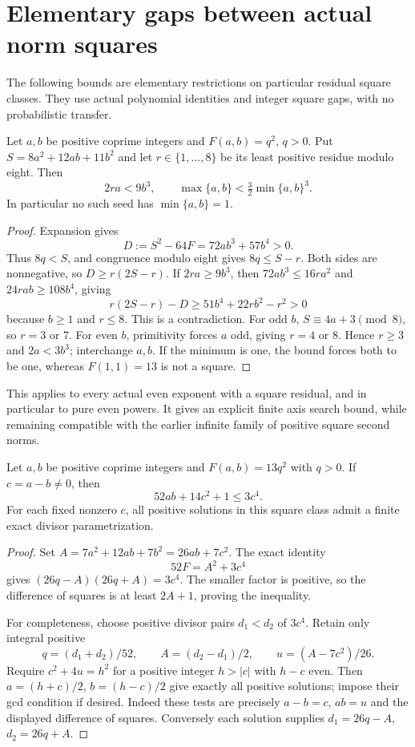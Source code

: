 \section{Elementary gaps between actual norm squares}
\label{sgap-section}

The following bounds are elementary restrictions on particular residual
square classes. They use actual polynomial identities and integer
square gaps, with no probabilistic transfer.

\begin{theorem}\label{sgap-axis}
Let $a,b$ be positive coprime integers and $F(a,b)=q^2$, $q>0$.
Put $S=8a^2+12ab+11b^2$ and let $r\in\{1,\ldots,8\}$ be its
least positive residue modulo eight. Then
\[
 2ra<9b^3,\qquad
 \max\{a,b\}<\tfrac32\min\{a,b\}^3.
\]
In particular no such seed has $\min\{a,b\}=1$.
\end{theorem}
\begin{proof}
Expansion gives
\[
 D:=S^2-64F=72ab^3+57b^4>0.
\]
Thus $8q<S$, and congruence modulo eight gives $8q\le S-r$.
Both sides are nonnegative, so $D\ge r(2S-r)$. If $2ra\ge9b^3$,
then $72ab^3\le16ra^2$ and $24rab\ge108b^4$, giving
\[
 r(2S-r)-D\ge51b^4+22rb^2-r^2>0
\]
because $b\ge1$ and $r\le8$. This is a contradiction. For odd $b$,
$S\equiv4a+3\pmod8$, so $r=3$ or $7$. For even $b$, primitivity
forces $a$ odd, giving $r=4$ or $8$. Hence $r\ge3$ and $2a<3b^3$;
interchange $a,b$. If the minimum is one, the bound forces both to
be one, whereas $F(1,1)=13$ is not a square.
\end{proof}

This applies to every actual even exponent with a square residual,
and in particular to pure even powers. It gives an explicit finite
axis search bound, while remaining compatible with the earlier
infinite family of positive square second norms.

\begin{proposition}\label{sgap-diagonal}
Let $a,b$ be positive coprime integers and $F(a,b)=13q^2$ with $q>0$.
If $c=a-b\ne0$, then
\[
 52ab+14c^2+1\le3c^4.
\]
For each fixed nonzero $c$, all positive solutions in this square
class admit a finite exact divisor parametrization.
\end{proposition}
\begin{proof}
Set $A=7a^2+12ab+7b^2=26ab+7c^2$. The exact identity
\[
 52F=A^2+3c^4
\]
gives $(26q-A)(26q+A)=3c^4$. The smaller factor is positive, so
the difference of squares is at least $2A+1$, proving the inequality.

For completeness, choose positive divisor pairs $d_1<d_2$ of $3c^4$.
Retain only integral positive
\[
 q=(d_1+d_2)/52,\qquad A=(d_2-d_1)/2,
 \qquad u=(A-7c^2)/26.
\]
Require $c^2+4u=h^2$ for a positive integer $h>|c|$ with $h-c$ even.
Then $a=(h+c)/2$, $b=(h-c)/2$ give exactly all positive solutions;
impose their gcd condition if desired. Indeed these tests are precisely
$a-b=c$, $ab=u$ and the displayed difference of squares. Conversely
each solution supplies $d_1=26q-A$, $d_2=26q+A$.
\end{proof}

